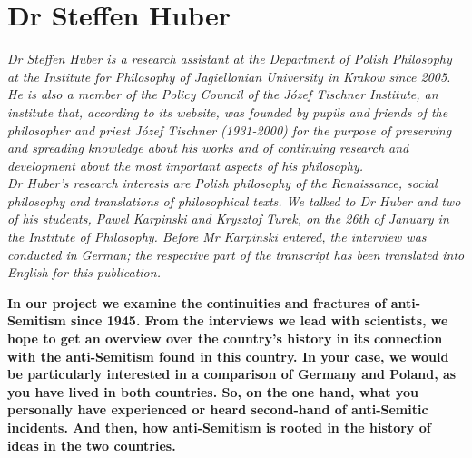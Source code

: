 \section{Dr Steffen Huber}

\textit{Dr Steffen Huber is a research assistant at the Department of Polish Philosophy at the Institute for Philosophy of Jagiellonian University in Krakow since 2005. He is also a member of the Policy Council of the Józef Tischner Institute, an institute that, according to its website, was founded by pupils and friends of the philosopher and priest Józef Tischner (1931-2000) for the purpose of preserving and spreading knowledge about his works and of continuing research and development about the most important aspects of his philosophy.\\ 
Dr Huber’s research interests are Polish philosophy of the Renaissance, social philosophy and translations of philosophical texts. We talked to Dr Huber and two of his students, Pawel Karpinski and Krysztof Turek, on the 26th of January in the Institute of Philosophy. Before Mr Karpinski entered, the interview was conducted in German; the respective part of the transcript has been translated into English for this publication.}\par
\vspace*{2em}
\textbf{In our project we examine the continuities and fractures of anti-Semitism since 1945. From the interviews we lead with scientists, we hope to get an overview over the country's history in its connection with the anti-Semitism found in this country. In your case, we would be particularly interested in a comparison of Germany and Poland, as you have lived in both countries. So, on the one hand, what you personally have experienced or heard second-hand of anti-Semitic incidents. And then, how anti-Semitism is rooted in the history of ideas in the two countries.} 


